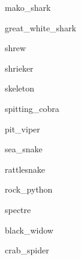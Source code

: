\documentclass[a4paper,serif]{module}
\begin{document}
\begin{newmonster}{mako_shark}\end{newmonster}

\begin{newmonster}{great_white_shark}\end{newmonster}

\begin{newmonster}{shrew}\end{newmonster}

\begin{newmonster}{shrieker}\end{newmonster}

\begin{newmonster}{skeleton}\end{newmonster}


\begin{newmonster}{spitting_cobra}\end{newmonster}

\begin{newmonster}{pit_viper}\end{newmonster}

\begin{newmonster}{sea_snake}\end{newmonster}

\begin{newmonster}{rattlesnake}\end{newmonster}

\begin{newmonster}{rock_python}\end{newmonster}

\begin{newmonster}{spectre}\end{newmonster}


\begin{newmonster}{black_widow}\end{newmonster}

\begin{newmonster}{crab_spider}\end{newmonster}
\end{document}
